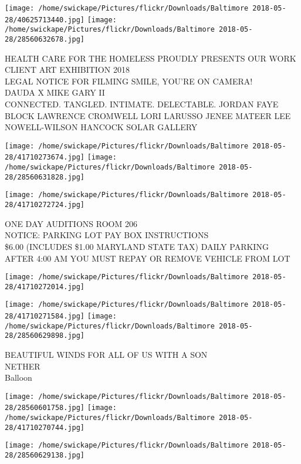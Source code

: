 \documentclass[10pt,letterpaper]{article}
\begin{document}
\texttt{[image: /home/swickape/Pictures/flickr/Downloads/Baltimore 2018-05-28/40625713440.jpg]}
\texttt{[image: /home/swickape/Pictures/flickr/Downloads/Baltimore 2018-05-28/28560632678.jpg]}

HEALTH CARE FOR THE HOMELESS PROUDLY PRESENTS OUR WORK CLIENT ART EXHIBITION 2018\\
LEGAL NOTICE FOR FILMING SMILE, YOU'RE ON CAMERA!\\
DAUDA X MIKE GARY II\\
CONNECTED.  TANGLED.  INTIMATE.  DELECTABLE.  JORDAN FAYE BLOCK LAWRENCE CROMWELL LORI LARUSSO JENEE MATEER LEE NOWELL{-}WILSON HANCOCK SOLAR GALLERY\\
\pagebreak

\texttt{[image: /home/swickape/Pictures/flickr/Downloads/Baltimore 2018-05-28/41710273674.jpg]}
\texttt{[image: /home/swickape/Pictures/flickr/Downloads/Baltimore 2018-05-28/28560631828.jpg]}

\texttt{[image: /home/swickape/Pictures/flickr/Downloads/Baltimore 2018-05-28/41710272724.jpg]}

ONE DAY AUDITIONS ROOM 206\\
NOTICE: PARKING LOT PAY BOX INSTRUCTIONS\\
\$6.00 (INCLUDES \$1.00 MARYLAND STATE TAX) DAILY PARKING AFTER 4:00 AM YOU MUST REPAY OR REMOVE VEHICLE FROM LOT\\
\pagebreak

\texttt{[image: /home/swickape/Pictures/flickr/Downloads/Baltimore 2018-05-28/41710272014.jpg]}

\vspace{0.25in}
\texttt{[image: /home/swickape/Pictures/flickr/Downloads/Baltimore 2018-05-28/41710271584.jpg]}
\texttt{[image: /home/swickape/Pictures/flickr/Downloads/Baltimore 2018-05-28/28560629898.jpg]}

BEAUTIFUL WINDS FOR ALL OF US WITH A SON\\
NETHER\\
Balloon\\
\pagebreak

\texttt{[image: /home/swickape/Pictures/flickr/Downloads/Baltimore 2018-05-28/28560601758.jpg]}
\texttt{[image: /home/swickape/Pictures/flickr/Downloads/Baltimore 2018-05-28/41710270744.jpg]}

\texttt{[image: /home/swickape/Pictures/flickr/Downloads/Baltimore 2018-05-28/28560629138.jpg]}
\end{document}
